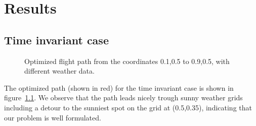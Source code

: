 \documentclass[ twoside,openright,titlepage,numbers=noenddot,headinclude,%
                footinclude=true,cleardoublepage=empty,abstractoff, %
                BCOR=5mm,paper=a4,fontsize=11pt,%
                ngerman,american,%
                ]{scrreprt}
\begin{document}
\chapter{Results}
\section{Time invariant case}
\begin{figure}

\caption{Optimized flight path from the coordinates 0.1,0.5 to 0.9,0.5, with different weather data.}
\label{fig:path1}
\end{figure}
The optimized path (shown in red) for the time invariant case is shown in figure~\ref{fig:path1}. We observe that the path leads nicely trough sunny weather grids including a detour to the sunniest spot on the grid at (0.5,0.35), indicating that our problem is well formulated.
\end{document}
